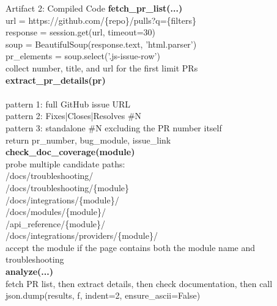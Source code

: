 \begin{CaseTraceBox}{Artifact 2: Compiled Code}
\small\ttfamily
\textbf{fetch\_pr\_list(...)} \\
\quad url = https://github.com/\{repo\}/pulls?q=\{filters\} \\
\quad response = session.get(url, timeout=30) \\
\quad soup = BeautifulSoup(response.text, 'html.parser') \\
\quad pr\_elements = soup.select('.js-issue-row') \\
\quad collect number, title, and url for the first limit PRs \\
\textbf{extract\_pr\_details(pr)} \\
\quad {} \\
\quad pattern 1: full GitHub issue URL \\
\quad pattern 2: Fixes|Closes|Resolves \#N \\
\quad pattern 3: standalone \#N excluding the PR number itself \\
\quad return pr\_number, bug\_module, issue\_link \\
\textbf{check\_doc\_coverage(module)} \\
\quad probe multiple candidate paths: \\
\quad /docs/troubleshooting/ \\
\quad /docs/troubleshooting/\{module\} \\
\quad /docs/integrations/\{module\}/ \\
\quad /docs/modules/\{module\}/ \\
\quad /api\_reference/\{module\}/ \\
\quad /docs/integrations/providers/\{module\}/ \\
\quad accept the module if the page contains both the module name and troubleshooting \\
\textbf{analyze(...)} \\
\quad fetch PR list, then extract details, then check documentation, then call json.dump(results, f, indent=2, ensure\_ascii=False)
\end{CaseTraceBox}

